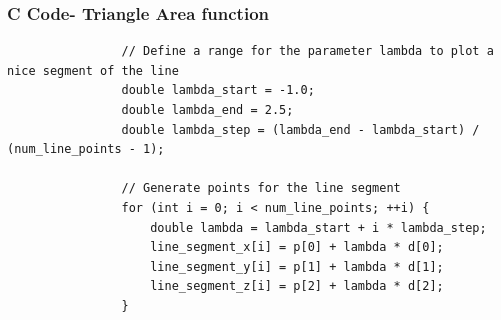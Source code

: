 \documentclass{beamer}
\begin{document}
		\begin{frame}[fragile]
			\frametitle{C Code- Triangle Area function }
			
			\begin{lstlisting}
				// Define a range for the parameter lambda to plot a nice segment of the line
				double lambda_start = -1.0;
				double lambda_end = 2.5;
				double lambda_step = (lambda_end - lambda_start) / (num_line_points - 1);
				
				// Generate points for the line segment
				for (int i = 0; i < num_line_points; ++i) {
					double lambda = lambda_start + i * lambda_step;
					line_segment_x[i] = p[0] + lambda * d[0];
					line_segment_y[i] = p[1] + lambda * d[1];
					line_segment_z[i] = p[2] + lambda * d[2];
				}
				
				\end{lstlisting}
			\end{frame}
	
\end{document}
